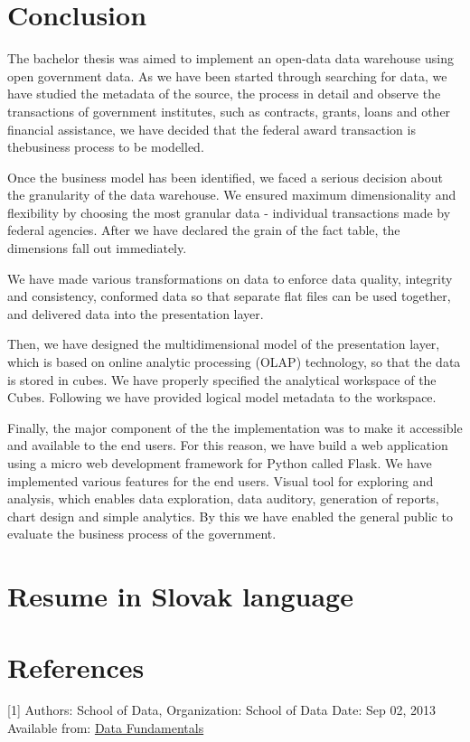 \documentclass[letterpaper,12pt,oneside]{sphinxmanual}
\begin{document}
\chapter{Conclusion}
\label{conclusion:conclusion}\label{conclusion::doc}
The bachelor thesis was aimed to implement an open-data data warehouse using open government data.
As we have been started through searching for data, we have studied the metadata of the source, the
process in detail and observe the transactions of government institutes, such as contracts, grants,
loans and other financial assistance, we have decided that the federal award transaction is thebusiness process to be modelled.

Once the business model has been identified, we faced a serious decision about the granularity of the data warehouse.
We ensured maximum dimensionality and flexibility by choosing the most granular data - individual transactions made by federal agencies.
After we have declared the grain of the fact table, the dimensions fall out immediately.

We have made various transformations on data to enforce data quality, integrity and consistency, conformed data so
that separate flat files can be used together, and delivered data into the presentation layer.

Then, we have designed the multidimensional model of the presentation layer, which is based on online analytic processing
(OLAP) technology, so that the data is stored in cubes. We have properly specified the analytical workspace of the Cubes.
Following we have provided logical model metadata to the workspace.

Finally, the major component of the the implementation was to make it accessible and available to the end users.
For this reason, we have build a web application using a micro web development framework for Python called Flask.
We have implemented various features for the end users. Visual tool for exploring and analysis, which enables data
exploration, data auditory, generation of reports, chart design and simple analytics. By this we have enabled the
general public to evaluate the business process of the government.


\chapter{Resume in Slovak language}
\label{resume:resume-in-slovak-language}\label{resume::doc}

\chapter{References}
\label{references:references}\label{references::doc}
\label{references:id1}{[}1{]} Authors: School of Data, Organization: School of Data Date: Sep 02, 2013 Available from: \href{http://schoolofdata.org/handbook/courses/what-is-data/}{Data Fundamentals}
\end{document}
